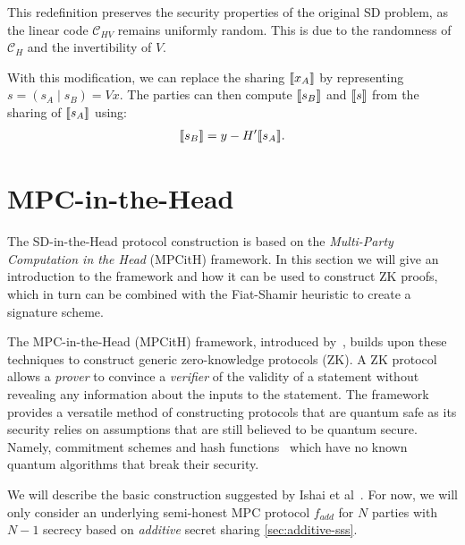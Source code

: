 \documentclass[11pt]{report}
\theoremstyle{definition}
\theoremstyle{plain}
\begin{document}
This redefinition preserves the security properties of the original SD problem, as the linear code $\mathcal{C}_{HV}$ remains uniformly random. This is due to the randomness of $\mathcal{C}_H$ and the invertibility of $V$.

With this modification, we can replace the sharing $\llbracket x_A \rrbracket$ by representing $s = (s_A \mid s_B) = Vx$. The parties can then compute $\llbracket s_B \rrbracket$ and $\llbracket s \rrbracket$ from the sharing of $\llbracket s_A \rrbracket$ using:
\begin{align*}
  \llbracket s_B \rrbracket = y - H'\llbracket s_A \rrbracket.
\end{align*}

\section{MPC-in-the-Head}\label{sec:mpcinth}

The SD-in-the-Head protocol construction is based on the \textit{Multi-Party Computation in the Head} (MPCitH) framework. In this section we will give an introduction to the framework and how it can be used to construct ZK proofs, which in turn can be combined with the Fiat-Shamir heuristic to create a signature scheme.

The MPC-in-the-Head (MPCitH) framework, introduced by~\cite{ishai2007zero}, builds upon these techniques to construct generic zero-knowledge protocols (ZK). A ZK protocol allows a \textit{prover} to convince a \textit{verifier} of the validity of a statement without revealing any information about the inputs to the statement. The framework provides a versatile method of constructing protocols that are quantum safe as its security relies on assumptions that are still believed to be quantum secure. Namely, commitment schemes and hash functions~\cite{feneuil2023threshold} which have no known quantum algorithms that break their security.

We will describe the basic construction suggested by Ishai et al~\cite{ishai2007zero}. For now, we will only consider an underlying semi-honest MPC protocol $f_{add}$ for $N$ parties with $N-1$ secrecy based on \textit{additive} secret sharing \autoref{sec:additive-sss}.
\end{document}
